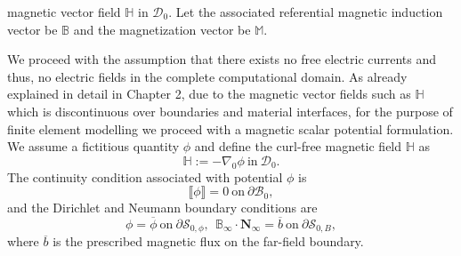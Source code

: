 magnetic vector field $\mathbb{H}$ in $\mathcal{D}_0$. Let the associated referential magnetic induction vector be $\mathbb{B}$ and the magnetization vector be $\mathbb{M}$. \par 
We proceed with the assumption that there exists no free electric currents and thus, no electric fields in the complete computational domain. As already explained in detail in Chapter 2, due to the magnetic vector fields such as $\mathbb{H}$ which is discontinuous over boundaries and material interfaces, for the purpose of finite element modelling we proceed with a magnetic scalar potential formulation. We assume a fictitious quantity $\phi$ and define the curl-free magnetic field $\mathbb{H}$ as \cite{ogden2011mechanics,Dorfmann2014} 
\begin{equation}
\mathbb{H} := -\nabla_0 \phi \ \text{in} \ \mathcal{D}_0.
\label{eq:3.0}
\end{equation}
The continuity condition associated with potential $\phi$ is 
\begin{equation}
\llbracket \phi \rrbracket = 0 \ \text{on} \ \partial\mathcal{B}_{0},
\label{eq:3.0.1}
\end{equation}
and the Dirichlet and Neumann boundary conditions are
\begin{equation}
\phi = \overline{\phi} \ \text{on} \ \partial \mathcal{S}_{0,\phi}, \ \ \mathbb{B}_{\infty} \cdot \mathbf{N}_{\infty} = \overline{b} \ \text{on} \ \partial\mathcal{S}_{0,B},
\label{eq:3.0.2}
\end{equation}
where $\overline{b}$ is the prescribed magnetic flux on the far-field boundary.

